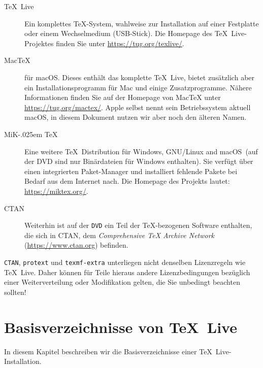 \documentclass[12pt,ngerman,a4paper,fullparskip]{report}
\newcommand{\TL}{\TeX\ Live\xspace}
\newcommand{\acro}[1]{\texttt{#1}}
\newcommand{\dirname}[1]{\texttt{#1}}
\newcommand{\pkgname}[1]{\texttt{#1}}
\newcommand\MIKTEX{MiK\kern-.025em \TeX}%
\providecommand*{\CTAN}{\acro{CTAN}\xspace}
\providecommand*{\DVD}{\acro{DVD}\xspace}
\providecommand*{\macOS}{macOS\xspace}
\begin{document}
\begin{description}
\item[\TL] Ein komplettes \TeX-System, wahlweise zur Installation auf einer Festplatte oder einem Wechselmedium (USB-Stick). Die Homepage des \TL-Projektes finden Sie unter \url{https://tug.org/texlive/}.

\item[Mac\TeX] für \macOS. Dieses enthält das komplette \TL, bietet zusätzlich aber ein Installationsprogramm für Mac und einige Zusatzprogramme. Nähere Informationen finden Sie auf der Homepage von Mac\TeX{} unter \url{https://tug.org/mactex/}. Apple selbst nennt sein Betriebssystem aktuell macOS, in diesem Dokument nutzen wir aber noch den älteren Namen.

\item [\MIKTEX] Eine weitere \TeX\ Distribution für Windows, GNU/Linux and \macOS\ (auf der DVD sind nur Binärdateien für Windows enthalten). Sie verfügt über einen integrierten Paket-Manager und installiert fehlende Pakete bei Bedarf aus dem Internet nach. Die Homepage des Projekts lautet:
\url{https://miktex.org/}.

\item[CTAN] Weiterhin ist auf der \DVD{} ein Teil der \TeX-bezogenen Software enthalten, die sich
in CTAN, dem \emph{Comprehensive \TeX{} Archive Network} (\url{https://www.ctan.org}) befinden.
\end{description}

\CTAN{}, \pkgname{protext} und \dirname{texmf-extra} unterliegen nicht denselben Lizenzregeln wie \TL. Daher können für Teile hieraus andere Lizenzbedingungen bezüglich einer Weiterverteilung oder
Modifikation gelten, die Sie unbedingt beachten sollten!

\section{Basisverzeichnisse von \TL}\label{sec:tld}

In diesem Kapitel beschreiben wir die Basisverzeichnisse einer \TL-Installation.
\end{document}
